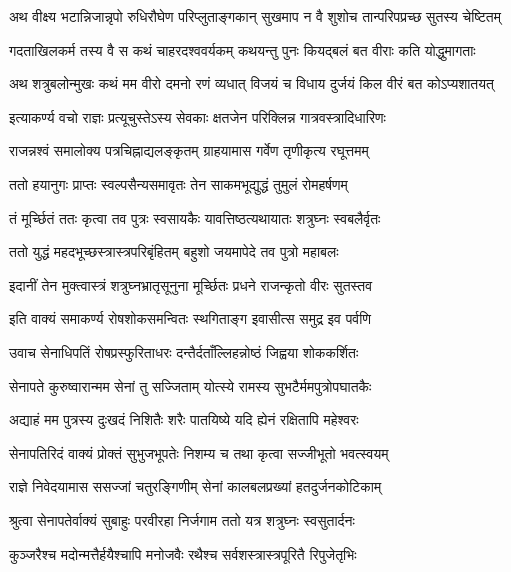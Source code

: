 

\twolineshloka
{अथ वीक्ष्य भटान्निजान्नृपो रुधिरौघेण परिप्लुताङ्गकान्}
{सुखमाप न वै शुशोच तान्परिपप्रच्छ सुतस्य चेष्टितम्}%

\twolineshloka
{गदताखिलकर्म तस्य वै स कथं चाहरदश्ववर्यकम्}
{कथयन्तु पुनः कियद्बलं बत वीराः कति योद्धुमागताः}%

\twolineshloka
{अथ शत्रुबलोन्मुखः कथं मम वीरो दमनो रणं व्यधात्}
{विजयं च विधाय दुर्जयं किल वीरं बत कोऽप्यशातयत्}%

\twolineshloka
{इत्याकर्ण्य वचो राज्ञः प्रत्यूचुस्तेऽस्य सेवकाः}
{क्षतजेन परिक्लिन्न गात्रवस्त्रादिधारिणः}%

\twolineshloka
{राजन्नश्वं समालोक्य पत्रचिह्नाद्यलङ्कृतम्}
{ग्राहयामास गर्वेण तृणीकृत्य रघूत्तमम्}%

\twolineshloka
{ततो हयानुगः प्राप्तः स्वल्पसैन्यसमावृतः}
{तेन साकमभूद्युद्धं तुमुलं रोमहर्षणम्}%

\twolineshloka
{तं मूर्च्छितं ततः कृत्वा तव पुत्रः स्वसायकैः}
{यावत्तिष्ठत्यथायातः शत्रुघ्नः स्वबलैर्वृतः}%

\twolineshloka
{ततो युद्धं महदभूच्छस्त्रास्त्रपरिबृंहितम्}
{बहुशो जयमापेदे तव पुत्रो महाबलः}%

\twolineshloka
{इदानीं तेन मुक्त्वास्त्रं शत्रुघ्नभ्रातृसूनुना}
{मूर्च्छितः प्रधने राजन्कृतो वीरः सुतस्तव}%

\twolineshloka
{इति वाक्यं समाकर्ण्य रोषशोकसमन्वितः}
{स्थगिताङ्ग इवासीत्स समुद्र इव पर्वणि}%

\twolineshloka
{उवाच सेनाधिपतिं रोषप्रस्फुरिताधरः}
{दन्तैर्दताँल्लिहन्नोष्ठं जिह्वया शोककर्शितः}%

\twolineshloka
{सेनापते कुरुष्वारान्मम सेनां तु सज्जिताम्}
{योत्स्ये रामस्य सुभटैर्ममपुत्रोपघातकैः}%

\twolineshloka
{अद्याहं मम पुत्रस्य दुःखदं निशितैः शरैः}
{पातयिष्ये यदि ह्येनं रक्षितापि महेश्वरः}%

\twolineshloka
{सेनापतिरिदं वाक्यं प्रोक्तं सुभुजभूपतेः}
{निशम्य च तथा कृत्वा सज्जीभूतो भवत्स्वयम्}%

\twolineshloka
{राज्ञे निवेदयामास ससज्जां चतुरङ्गिणीम्}
{सेनां कालबलप्रख्यां हतदुर्जनकोटिकाम्}%

\twolineshloka
{श्रुत्वा सेनापतेर्वाक्यं सुबाहुः परवीरहा}
{निर्जगाम ततो यत्र शत्रुघ्नः स्वसुतार्दनः}%

\twolineshloka
{कुञ्जरैश्च मदोन्मत्तैर्हयैश्चापि मनोजवैः}
{रथैश्च सर्वशस्त्रास्त्रपूरितै रिपुजेतृभिः}%

